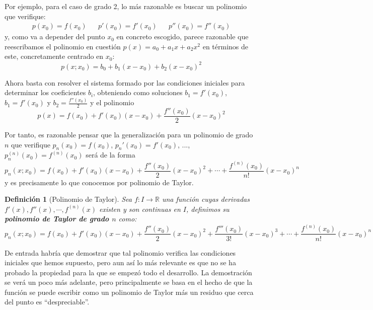 \documentclass[10pt,a4paper,openright]{book}
\theoremstyle{break}
\newtheorem{defi}{Definición}[chapter]
\begin{document}
Por ejemplo, para el caso de grado 2, lo más razonable es buscar un polinomio que verifique:
\begin{align*}
p(x_0)=f(x_0)  & &
p'(x_0)=f'(x_0) & &
p''(x_0)=f''(x_0)
\end{align*}
y, como va a depender del punto $x_0$ en concreto escogido, parece razonable que reescribamos el polinomio en cuestión $p(x)=a_0+a_1x+a_2x^2$ en términos de este, concretamente centrado en $x_0$:
\[
p(x; x_0)=b_0+b_1(x-x_0)+b_2(x-x_0)^2
\]

Ahora basta con resolver el sistema formado por las condiciones iniciales para determinar los coeficientes $b_i$, obteniendo como soluciones $b_1=f'(x_0)$, $b_1 = f'(x_0)$ y $b_2= \frac{f''(x_0)}{2}$ y el polinomio
\[
p(x)=f(x_0)+f'(x_0)(x-x_0)+\frac{f''(x_0)}{2}(x-x_0)^2
\]

Por tanto, es razonable pensar que la generalización para un polinomio de grado $n$ que verifique $p_n(x_0)=f(x_0)$, $p_n'(x_0)=f'(x_0)$, ..., $p_n^{(n)}(x_0)=f^{(n)}(x_0)$ será de la forma
\[
p_n(x; x_0)=f(x_0)+f'(x_0)(x-x_0)+\frac{f''(x_0)}{2}(x-x_0)^2 + \cdots + \frac{f^{(n)}(x_0)}{n!}(x-x_0)^n
\]
y es precisamente lo que conocemos por polinomio de Taylor.

\begin{defi}[Polinomio de Taylor]
Sea $f: I\rightarrow \mathbb{R}$ una función cuyas derivadas $f'(x), f''(x), \cdots, f^{(n)}(x)$ existen y son continuas en $I$, definimos su \textbf{polinomio de Taylor de grado $n$} como:
$$p_n(x; x_0)=f(x_0)+f'(x_0)(x-x_0)+\frac{f''(x_0)}{2}(x-x_0)^2+\frac{f'''(x_0)}{3!}(x-x_0)^3+ \cdots +\frac{f^{(n)}(x_0)}{n!}(x-x_0)^n$$
\end{defi}

De entrada habría que demostrar que tal polinomio verifica las condiciones iniciales que hemos supuesto, pero aun así lo más relevante es que no se ha probado la propiedad para la que se empezó todo el desarrollo. La demostración se verá un poco más adelante, pero principalmente se basa en el hecho de que la función se puede escribir como un polinomio de Taylor más un residuo que cerca del punto es ``despreciable''.
\end{document}

